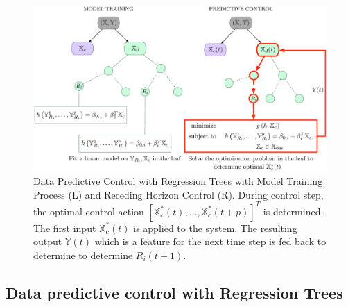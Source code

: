 \begin{figure}[b!]
\centering
\includegraphics[width=0.95\linewidth]{Figures/DPC_tree2.eps}
\caption{Data Predictive Control with Regression Trees with Model Training Process (L) and Receding Horizon Control (R). During control step, the optimal control action $\left[\mathbb{X}^*_c(t),\dots,\mathbb{X}^*_c(t+p)\right]^T $ is determined. The first input $\mathbb{X}^*_c(t)$ is applied to the system. The resulting output $\mathbb{Y}(t)$ which is a feature for the next time step is fed back to determine to determine $R_{i}(t+1)$.}
\captionsetup{justification=centering}
\label{F:DPC_schematic}
\end{figure}

\subsection{Data predictive control with Regression Trees}
\label{SS:control_algo}

